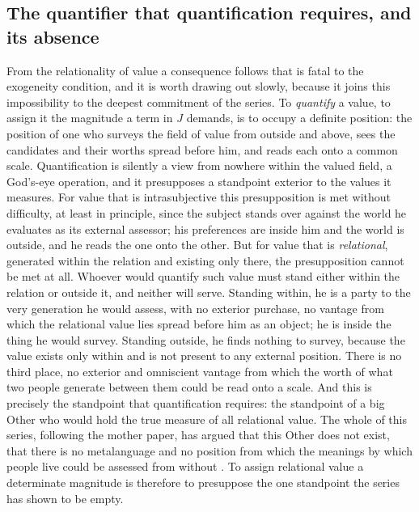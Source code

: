\subsection*{The quantifier that quantification requires, and its absence}

From the relationality of value a consequence follows that is fatal to the exogeneity condition, and it is worth drawing out slowly, because it joins this impossibility to the deepest commitment of the series. To \emph{quantify} a value, to assign it the magnitude a term in $J$ demands, is to occupy a definite position: the position of one who surveys the field of value from outside and above, sees the candidates and their worths spread before him, and reads each onto a common scale. Quantification is silently a view from nowhere within the valued field, a God's-eye operation, and it presupposes a standpoint exterior to the values it measures. For value that is intrasubjective this presupposition is met without difficulty, at least in principle, since the subject stands over against the world he evaluates as its external assessor; his preferences are inside him and the world is outside, and he reads the one onto the other. But for value that is \emph{relational}, generated within the relation and existing only there, the presupposition cannot be met at all. Whoever would quantify such value must stand either within the relation or outside it, and neither will serve. Standing within, he is a party to the very generation he would assess, with no exterior purchase, no vantage from which the relational value lies spread before him as an object; he is inside the thing he would survey. Standing outside, he finds nothing to survey, because the value exists only within and is not present to any external position. There is no third place, no exterior and omniscient vantage from which the worth of what two people generate between them could be read onto a scale. And this is precisely the standpoint that quantification requires: the standpoint of a big Other who would hold the true measure of all relational value. The whole of this series, following the mother paper, has argued that this Other does not exist, that there is no metalanguage and no position from which the meanings by which people live could be assessed from without \parencite{wan2024grb,paperxiii}. To assign relational value a determinate magnitude is therefore to presuppose the one standpoint the series has shown to be empty.

